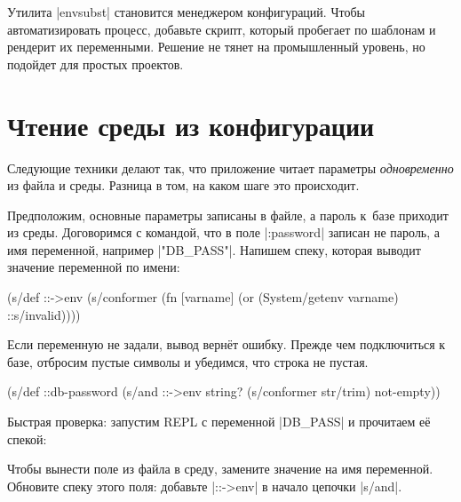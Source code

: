 Утилита \spverb|envsubst| становится менеджером конфигураций. Чтобы
автоматизировать процесс, добавьте скрипт, который пробегает по шаблонам и
рендерит их переменными. Решение не тянет на промышленный уровень, но подойдет
для простых проектов.

\section{Чтение среды из конфигурации}

Следующие техники делают так, что приложение читает параметры
\emph{одновременно} из файла и среды. Разница в том, на каком шаге это
происходит.

Предположим, основные параметры записаны в файле, а пароль к~базе приходит из
среды. Договоримся с командой, что в поле \spverb|:password| записан не пароль,
а имя переменной, например \spverb|"DB_PASS"|. Напишем спеку, которая выводит
значение переменной по имени:

\begin{english}
  \begin{clojure}
(s/def ::->env
  (s/conformer
   (fn [varname]
     (or (System/getenv varname)
         ::s/invalid))))
  \end{clojure}
\end{english}

Если переменную не задали, вывод верн\"{е}т ошибку. Прежде чем подключиться к базе,
отбросим пустые символы и убедимся, что строка не пустая.

\begin{english}
  \begin{clojure}
(s/def ::db-password
  (s/and ::->env
         string?
         (s/conformer str/trim)
         not-empty))
  \end{clojure}
\end{english}

Быстрая проверка: запустим REPL с переменной \spverb|DB_PASS| и прочитаем е\"{е}
спекой:

\begin{english}
  \begin{bash}
DB_PASS='*(&fd}A53z#$!' lein repl

(s/conform ::db-password "DB_PASS")
"*(&fd}A53z#$!"
  \end{bash}
\end{english}

Чтобы вынести поле из файла в среду, замените значение на имя
переменной. Обновите спеку этого поля: добавьте \spverb|::->env| в начало
цепочки \spverb|s/and|.

